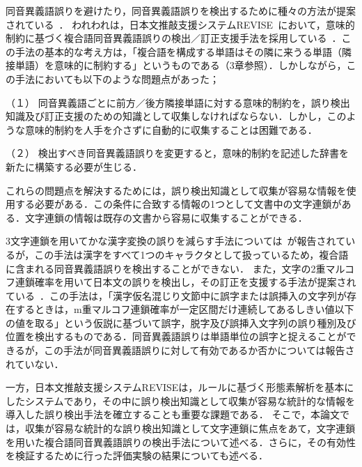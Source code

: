 同音異義語誤りを避けたり，同音異義語誤りを検出するために種々の方法が提案されている~\cite{FukushimaAndOtakeAndOyamaAndShuto1986,MakinoAndKizawa1981,Nakano1982,OshimaAndAbeAndYuuraAndTakeichi1986,SuzukiAndTakeda1989,TanakaAndMizutaniAndYoshida1984a,TanakaAndYoshida1987}．
われわれは，日本文推敲支援システムREVISE~\cite{OharaAndTakagiAndHayashiAndTakeishi1991}において，意味的制約に基づく複合語同音異義語誤りの検出／訂正支援手法を採用している~\cite{Oku1994,Oku1996}．この手法の基本的な考え方は，「複合語を構成する単語はその隣に来うる単語（隣接単語）を意味的に制約する」というものである（3章参照）．しかしながら，この手法においても以下のような問題点があった；

\begin{description}
\item{（１）}
同音異義語ごとに前方／後方隣接単語に対する意味的制約を，誤り検出知識及び訂正支援のための知識として収集しなければならない．しかし，このような意味的制約を人手を介さずに自動的に収集することは困難である．
\item{（２）}
検出すべき同音異義語誤りを変更すると，意味的制約を記述した辞書を新たに構築する必要が生じる．
\end{description}

これらの問題点を解決するためには，誤り検出知識として収集が容易な情報を使用する必要がある．この条件に合致する情報の1つとして文書中の文字連鎖がある．文字連鎖の情報は既存の文書から容易に収集することができる．

3文字連鎖を用いてかな漢字変換の誤りを減らす手法については~\cite{TochinaiAndItoAndSuzuki1986}が報告されているが，この手法は漢字をすべて1つのキャラクタとして扱っているため，複合語に含まれる同音異義語誤りを検出することができない．
また，文字の2重マルコフ連鎖確率を用いて日本文の誤りを検出し，その訂正を支援する手法が提案されている~\cite{ArakiAndIkeharaAndTsukahara1993}．この手法は，「漢字仮名混じり文節中に誤字または誤挿入の文字列が存在するときは，m重マルコフ連鎖確率が一定区間だけ連続してあるしきい値以下の値を取る」という仮説に基づいて誤字，脱字及び誤挿入文字列の誤り種別及び位置を検出するものである．同音異義語誤りは単語単位の誤字と捉えることができるが，この手法が同音異義語誤りに対して有効であるか否かについては報告されていない．

一方，日本文推敲支援システムREVISEは，ルールに基づく形態素解析を基本にしたシステムであり，その中に誤り検出知識として収集が容易な統計的な情報を導入した誤り検出手法を確立することも重要な課題である．
そこで，本論文では，収集が容易な統計的な誤り検出知識として文字連鎖に焦点をあて，文字連鎖を用いた複合語同音異義語誤りの検出手法について述べる．さらに，その有効性を検証するために行った評価実験の結果についても述べる．


